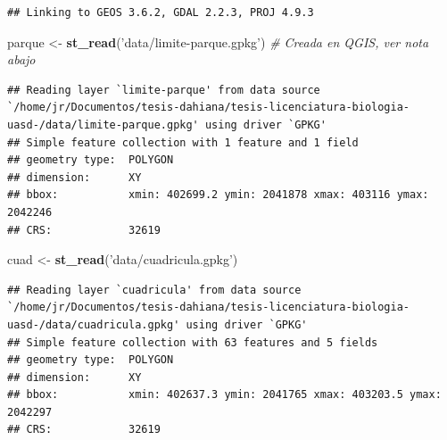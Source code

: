 \documentclass[11pt,]{article}
\newenvironment{Shaded}{\begin{snugshade}}{\end{snugshade}}
\newcommand{\CommentTok}[1]{\textcolor[rgb]{0.56,0.35,0.01}{\textit{#1}}}
\newcommand{\DataTypeTok}[1]{\textcolor[rgb]{0.13,0.29,0.53}{#1}}
\newcommand{\KeywordTok}[1]{\textcolor[rgb]{0.13,0.29,0.53}{\textbf{#1}}}
\newcommand{\NormalTok}[1]{#1}
\newcommand{\OperatorTok}[1]{\textcolor[rgb]{0.81,0.36,0.00}{\textbf{#1}}}
\newcommand{\StringTok}[1]{\textcolor[rgb]{0.31,0.60,0.02}{#1}}
\begin{document}
\begin{verbatim}
## Linking to GEOS 3.6.2, GDAL 2.2.3, PROJ 4.9.3
\end{verbatim}

\begin{Shaded}
\begin{Highlighting}[]
\NormalTok{parque <-}\StringTok{ }\KeywordTok{st_read}\NormalTok{(}\StringTok{'data/limite-parque.gpkg'}\NormalTok{) }\CommentTok{# Creada en QGIS, ver nota abajo}
\end{Highlighting}
\end{Shaded}

\begin{verbatim}
## Reading layer `limite-parque' from data source `/home/jr/Documentos/tesis-dahiana/tesis-licenciatura-biologia-uasd-/data/limite-parque.gpkg' using driver `GPKG'
## Simple feature collection with 1 feature and 1 field
## geometry type:  POLYGON
## dimension:      XY
## bbox:           xmin: 402699.2 ymin: 2041878 xmax: 403116 ymax: 2042246
## CRS:            32619
\end{verbatim}

\begin{Shaded}
\begin{Highlighting}[]
\NormalTok{cuad <-}\StringTok{ }\KeywordTok{st_read}\NormalTok{(}\StringTok{'data/cuadricula.gpkg'}\NormalTok{)}
\end{Highlighting}
\end{Shaded}

\begin{verbatim}
## Reading layer `cuadricula' from data source `/home/jr/Documentos/tesis-dahiana/tesis-licenciatura-biologia-uasd-/data/cuadricula.gpkg' using driver `GPKG'
## Simple feature collection with 63 features and 5 fields
## geometry type:  POLYGON
## dimension:      XY
## bbox:           xmin: 402637.3 ymin: 2041765 xmax: 403203.5 ymax: 2042297
## CRS:            32619
\end{verbatim}

\begin{Shaded}
\end{Shaded}
\end{document}
